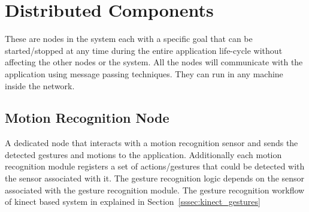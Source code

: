 \section{Distributed Components}
\label{ssec:dist_comp}
These are nodes in the system each with a specific goal that can be started/stopped at any time during the entire application life-cycle without affecting the other nodes or the system. All the nodes will communicate with the application using message passing techniques. They can run in any machine inside the network.

\subsection{Motion Recognition Node} A dedicated node that interacts with a motion recognition sensor and sends the detected gestures and motions to the application. Additionally each motion recognition module registers a set of actions/gestures that could be detected with the sensor associated with it. The gesture recognition logic depends on the sensor associated with the gesture recognition module. The gesture recognition workflow of kinect based system in explained in Section~\ref{sssec:kinect_gestures}
